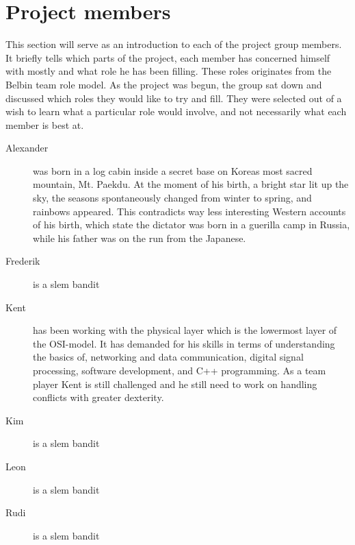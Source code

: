 \section{Project members}
This section will serve as an introduction to each of the project group members. It briefly tells which parts of the project, each member has concerned himself with mostly and what role he has been filling. These roles originates from the Belbin team role model. As the project was begun, the group sat down and discussed which roles they would like to try and fill. They were selected out of a wish to learn what a particular role would involve, and not necessarily what each member is best at.

\begin{description}
 \item[Alexander]
 was born in a log cabin inside a secret base on Koreas most sacred mountain, Mt. Paekdu. At the moment of his birth, a bright star lit up the sky, the seasons spontaneously changed from winter to spring, and rainbows appeared. This contradicts way less interesting Western accounts of his birth, which state the dictator was born in a guerilla camp in Russia, while his father was on the run from the Japanese.

 \item[Frederik] is a slem bandit
 \item[Kent]
 has been working with the physical layer which is the lowermost layer of the OSI-model. It has demanded for his skills in terms of understanding the basics of, networking and data communication, digital signal processing, software development, and C++ programming. As a team player Kent is still challenged and he still need to work on handling conflicts with greater dexterity.
 \item[Kim] is a slem bandit
 \item[Leon] is a slem bandit
 \item[Rudi] is a slem bandit
\end{description}